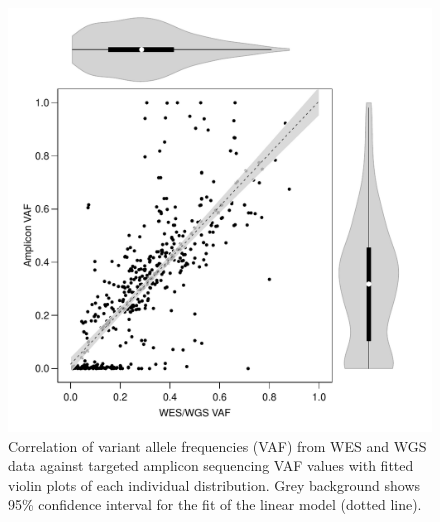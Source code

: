 \begin{figure}[!ht]
\centering
  \includegraphics[width=\textwidth]{Appendices/Variantcalling/supp/S7}
  \caption[Correlation of variant allele frequencies in validation]{Correlation of variant allele frequencies (VAF) from WES and WGS data against targeted amplicon sequencing VAF values with fitted violin plots of each individual distribution. Grey background shows 95\% confidence interval for the fit of the linear model (dotted line).}\label{A:fig:S07}
\end{figure}

